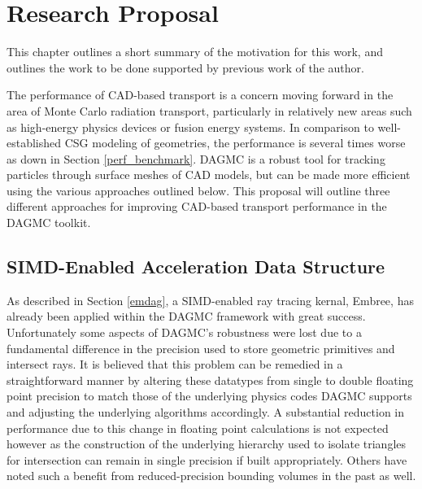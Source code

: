 \documentclass[12pt, a4paper]{article}
\begin{document}
\section{Research Proposal}%
\label{research_proposal}

This chapter outlines a short summary of the motivation for this work, and outlines the work to be done supported by previous work of the author.

The performance of CAD-based transport is a concern moving forward in the area of Monte Carlo radiation transport, particularly in relatively new areas such as high-energy physics devices or fusion energy systems. In comparison to well-established CSG modeling of geometries, the performance is several times worse as down in Section \ref{perf_benchmark}. DAGMC is a robust tool for tracking particles through surface meshes of CAD models, but can be made more efficient using the various approaches outlined below. This proposal will outline three different approaches for improving CAD-based transport performance in the DAGMC toolkit.

\subsection{SIMD-Enabled Acceleration Data Structure}

As described in Section \ref{emdag}, a SIMD-enabled ray tracing kernal, Embree, has already been applied within the DAGMC framework with great success. Unfortunately some aspects of DAGMC's robustness were lost due to a fundamental difference in the precision used to store geometric primitives and intersect rays. It is believed that this problem can be remedied in a straightforward manner by altering these datatypes from single to double floating point precision to match those of the underlying physics codes DAGMC supports and adjusting the underlying algorithms accordingly. A substantial reduction in performance due to this change in floating point calculations is not expected however as the construction of the underlying hierarchy used to isolate triangles for intersection can remain in single precision if built appropriately. Others have noted such a benefit from reduced-precision bounding volumes in the past as well\cite{Mahovsky_2005}.


\end{document}

